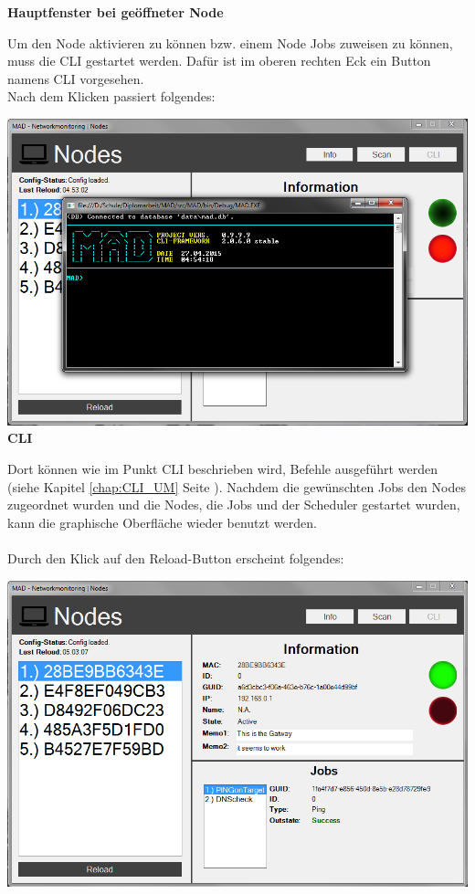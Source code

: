 \documentclass[12pt,a4paper]{report}
\begin{document}
\begin{onehalfspace}
\begin{center}
\textbf{Hauptfenster bei geöffneter Node}
\end{center}
Um den Node aktivieren zu können bzw. einem Node Jobs zuweisen zu können, muss die CLI gestartet werden. Dafür ist im oberen rechten Eck ein Button namens CLI vorgesehen.\\Nach dem Klicken passiert folgendes:
\begin{center}
\includegraphics[scale=0.7]{../docs/lyaton/graphics/GUI_v3_cli.png}\\
\textbf{CLI}
\end{center}
Dort können wie im Punkt CLI beschrieben wird, Befehle ausgeführt werden (siehe Kapitel \ref{chap:CLI_UM} Seite \pageref{chap:CLI_UM}). Nachdem die gewünschten Jobs den Nodes zugeordnet wurden und die Nodes, die Jobs und der Scheduler gestartet wurden, kann die graphische Oberfläche wieder benutzt werden.\\\\
Durch den Klick auf den Reload-Button erscheint folgendes:
\begin{center}
\includegraphics[scale=0.7]{../docs/lyaton/graphics/GUI_v3_jobclick.png}\\

\end{center}
\end{onehalfspace}
\end{document}
